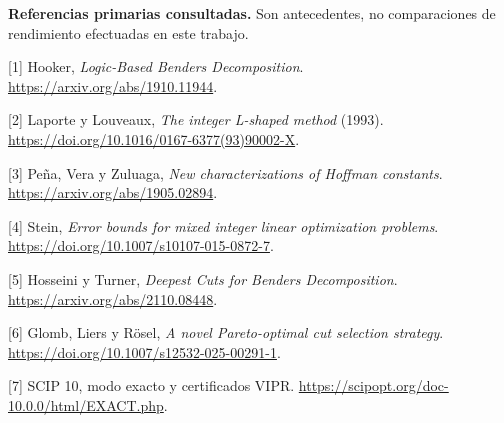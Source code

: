 \documentclass[10pt,a4paper]{article}
\begin{document}
\small
\textbf{Referencias primarias consultadas.} Son antecedentes, no comparaciones
de rendimiento efectuadas en este trabajo.

[1] Hooker, \emph{Logic-Based Benders Decomposition}.
\url{https://arxiv.org/abs/1910.11944}.

[2] Laporte y Louveaux, \emph{The integer L-shaped method} (1993).
\url{https://doi.org/10.1016/0167-6377(93)90002-X}.

[3] Peña, Vera y Zuluaga, \emph{New characterizations of Hoffman constants}.
\url{https://arxiv.org/abs/1905.02894}.

[4] Stein, \emph{Error bounds for mixed integer linear optimization problems}.
\url{https://doi.org/10.1007/s10107-015-0872-7}.

[5] Hosseini y Turner, \emph{Deepest Cuts for Benders Decomposition}.
\url{https://arxiv.org/abs/2110.08448}.

[6] Glomb, Liers y Rösel, \emph{A novel Pareto-optimal cut selection strategy}.
\url{https://doi.org/10.1007/s12532-025-00291-1}.

[7] SCIP 10, modo exacto y certificados VIPR.
\url{https://scipopt.org/doc-10.0.0/html/EXACT.php}.
\end{document}
